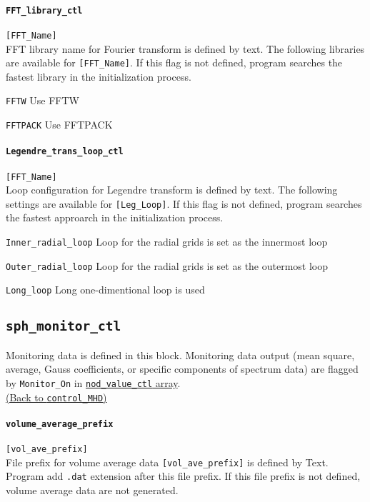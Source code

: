 \paragraph{\tt FFT\_library\_ctl}
\label{href_t:FFT_library_ctl}
\verb|[FFT_Name]| \\
FFT library name for Fourier transform is defined by text. The following libraries are available for \verb|[FFT_Name]|. 
If this flag is not defined, program searches the fastest library in the initialization process.
%
\begin{description}
\item{\tt FFTW}		Use FFTW
\item{\tt FFTPACK}	Use FFTPACK
\end{description}
%

\paragraph{\tt Legendre\_trans\_loop\_ctl}
\label{href_t:Legendre_trans_loop_ctl}
\verb|[FFT_Name]| \\
Loop configuration for Legendre transform is defined by text. The following settings are available for \verb|[Leg_Loop]|. 
If this flag is not defined, program searches the fastest approarch in the initialization process.
%
\begin{description}
\item{\tt Inner\_radial\_loop}	Loop for the radial grids is set as the innermost loop
\item{\tt Outer\_radial\_loop}	Loop for the radial grids is set as the outermost loop
\item{\tt Long\_loop}	        Long one-dimentional loop is used
\end{description}
%

%
\subsection{\tt sph\_monitor\_ctl}
\label{href_t:sph_monitor_ctl}
Monitoring data is defined in this block. Monitoring data output (mean square, average, Gauss coefficients, or specific components of spectrum data) are flagged by {\tt Monitor\_On} in \hyperref[href_t:nod_value_ctl]{ {\tt nod\_value\_ctl} array}. \\
\hyperref[href_i:sph_monitor_ctl]{(Back to {\tt control\_MHD})}

\paragraph{\tt volume\_average\_prefix}
\label{href_t:volume_average_prefix}
\verb|[vol_ave_prefix]| \\
File prefix for volume average data \verb|[vol_ave_prefix]| is defined by Text. Program add {\tt .dat} extension after this file prefix. If this file prefix is not defined, volume average data are not generated. 

